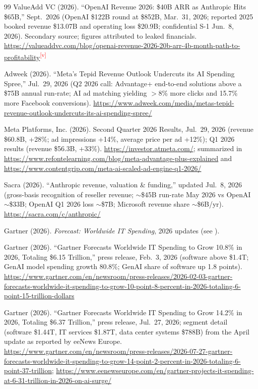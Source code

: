 \documentclass[11pt,letterpaper]{article}
\newcommand{\verify}{\textsuperscript{\textcolor{red}{[v]}}}
\begin{document}
\begin{thebibliography}{99}
ValueAdd VC (2026). ``OpenAI Revenue 2026: \$40B ARR as Anthropic Hits \$65B,'' Sept.~2026 (OpenAI \$122B round at \$852B, Mar.~31, 2026; reported 2025 booked revenue \$13.07B and operating loss \$20.9B; confidential S-1 Jun.~8, 2026). Secondary source; figures attributed to leaked financials. \url{https://valueaddvc.com/blog/openai-revenue-2026-20b-arr-4b-month-path-to-profitability}\verify

Adweek (2026). ``Meta's Tepid Revenue Outlook Undercuts its AI Spending Spree,'' Jul.~29, 2026 (Q2 2026 call: Advantage+ end-to-end solutions above a \$75B annual run-rate; AI ad matching yielding $>$8\% more clicks and 15.7\% more Facebook conversions). \url{https://www.adweek.com/media/metas-tepid-revenue-outlook-undercuts-its-ai-spending-spree/}

Meta Platforms, Inc. (2026). Second Quarter 2026 Results, Jul.~29, 2026 (revenue \$60.8B, +28\%; ad impressions +14\%, average price per ad +12\%); Q1 2026 results (revenue \$56.3B, +33\%). \url{https://investor.atmeta.com/}; summarized in \url{https://www.refontelearning.com/blog/meta-advantage-plus-explained} and \url{https://www.contentgrip.com/meta-ai-scaled-ad-engine-q1-2026/}

Sacra (2026). ``Anthropic revenue, valuation \& funding,'' updated Jul.~8, 2026 (gross-basis recognition of reseller revenue; $\sim$\$45B run-rate May 2026 vs OpenAI $\sim$\$33B; OpenAI Q1 2026 loss $\sim$\$7B; Microsoft revenue share $\sim$\$6B/yr). \url{https://sacra.com/c/anthropic/}

Gartner (2026). \textit{Forecast: Worldwide IT Spending}, 2026 updates (see \cite{ref:gartner_it_feb2026,ref:gartner_it_jul2026}).

Gartner (2026). ``Gartner Forecasts Worldwide IT Spending to Grow 10.8\% in 2026, Totaling \$6.15 Trillion,'' press release, Feb.~3, 2026 (software above \$1.4T; GenAI model spending growth 80.8\%; GenAI share of software up 1.8 points). \url{https://www.gartner.com/en/newsroom/press-releases/2026-02-03-gartner-forecasts-worldwide-it-spending-to-grow-10-point-8-percent-in-2026-totaling-6-point-15-trillion-dollars}

Gartner (2026). ``Gartner Forecasts Worldwide IT Spending to Grow 14.2\% in 2026, Totaling \$6.37 Trillion,'' press release, Jul.~27, 2026; segment detail (software \$1.44T, IT services \$1.87T, data center systems \$788B) from the April update as reported by eeNews Europe. \url{https://www.gartner.com/en/newsroom/press-releases/2026-07-27-gartner-forecasts-worldwide-it-spending-to-grow-14-point-2-percent-in-2026-totaling-6-point-37-trillion}; \url{https://www.eenewseurope.com/en/gartner-projects-it-spending-at-6-31-trillion-in-2026-on-ai-surge/}


\end{thebibliography}
\end{document}
